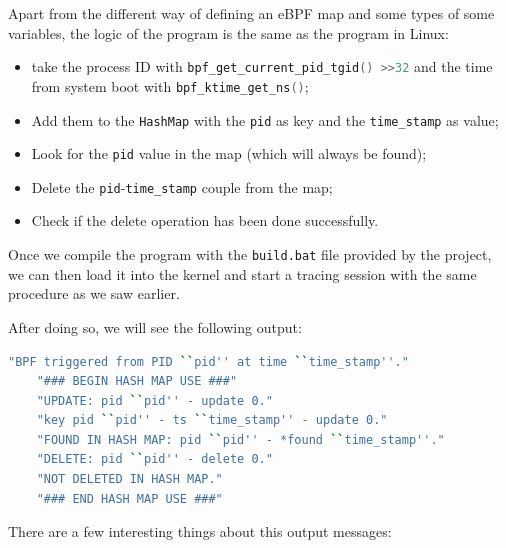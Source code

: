 Apart from the different way of defining an eBPF map and some types of some variables, the logic of the program is the same as the program in Linux: 

\begin{itemize}
	\item 
		take the process ID with \colorbox{backcolour}{\lstinline[style=cstyle, language=C]|bpf_get_current_pid_tgid() >>32|} and the time from system boot with \colorbox{backcolour}{\lstinline[style=cstyle, language=C]|bpf_ktime_get_ns()|};
	\item 
		Add them to the \colorbox{backcolour}{\lstinline[style=cstyle, language=C]|HashMap|} with the \colorbox{backcolour}{\lstinline[style=cstyle, language=C]|pid|} as key and the \colorbox{backcolour}{\lstinline[style=cstyle, language=C]|time_stamp|} as value;
	\item 
		Look for the \colorbox{backcolour}{\lstinline[style=cstyle, language=C]|pid|} value in the map (which will always be found);
	\item 
		Delete the \colorbox{backcolour}{\lstinline[style=cstyle, language=C]|pid|}-\colorbox{backcolour}{\lstinline[style=cstyle, language=C]|time_stamp|} couple from the map;
	\item 
		Check if the delete operation has been done successfully.
\end{itemize}

Once we compile the program with the \colorbox{backcolour}{\lstinline[style=commandline, language=bash]|build.bat|} file provided by the project, we can then load it into the kernel and start a tracing session with the same procedure as we saw earlier.

After doing so, we will see the following output:

\begin{lstlisting}[style=commandline, language=bash, caption={hash\_map\_use.c program output}]
	"BPF triggered from PID ``pid'' at time ``time_stamp''."
	"### BEGIN HASH MAP USE ###"
	"UPDATE: pid ``pid'' - update 0."
	"key pid ``pid'' - ts ``time_stamp'' - update 0."
	"FOUND IN HASH MAP: pid ``pid'' - *found ``time_stamp''."
	"DELETE: pid ``pid'' - delete 0."
	"NOT DELETED IN HASH MAP."
	"### END HASH MAP USE ###"
\end{lstlisting}

There are a few interesting things about this output messages:

